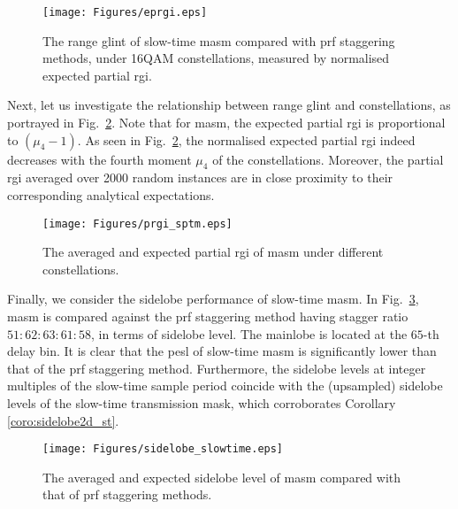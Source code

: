 \documentclass[journal,a4paper,10pt, romanappendices]{IEEEtran}
\begin{document}
\begin{figure}[t]
    \centering
    \texttt{[image: Figures/eprgi.eps]}
    \caption{The range glint of slow-time \ac{masm} compared with \ac{prf} staggering methods, under 16QAM constellations, measured by normalised expected partial \ac{rgi}.}
    \label{fig:eprgi}
    \vspace{-4mm}
\end{figure}

Next, let us investigate the relationship between range glint and constellations, as portrayed in Fig.~\ref{fig:prgi_stpm}. Note that for \ac{masm}, the expected partial \ac{rgi} is proportional to $(\mu_4-1)$. As seen in Fig.~\ref{fig:prgi_stpm}, the normalised expected partial \ac{rgi} indeed decreases with the fourth moment $\mu_4$ of the constellations. Moreover, the partial \ac{rgi} averaged over 2000 random instances are in close proximity to their corresponding analytical expectations.

\begin{figure}[t]
    \centering
    \texttt{[image: Figures/prgi\_sptm.eps]}
    \caption{The averaged and expected partial \ac{rgi} of \ac{masm} under different constellations.}
    \label{fig:prgi_stpm}
    \vspace{-4mm}
\end{figure}

Finally, we consider the sidelobe performance of slow-time \ac{masm}. In Fig.~\ref{fig:sidelobe_slowtime}, \ac{masm} is compared against the \ac{prf} staggering method having stagger ratio $51:62:63:61:58$, in terms of sidelobe level. The mainlobe is located at the $65$-th delay bin. It is clear that the \ac{pesl} of slow-time \ac{masm} is significantly lower than that of the \ac{prf} staggering method. Furthermore, the sidelobe levels at integer multiples of the slow-time sample period coincide with the (upsampled) sidelobe levels of the slow-time transmission mask, which corroborates Corollary \ref{coro:sidelobe2d_st}.

\begin{figure}[t]
    \centering
    \texttt{[image: Figures/sidelobe\_slowtime.eps]}
    \caption{The averaged and expected sidelobe level of \ac{masm} compared with that of \ac{prf} staggering methods.}
    \label{fig:sidelobe_slowtime}
    \vspace{-4mm}
\end{figure}
\end{document}
